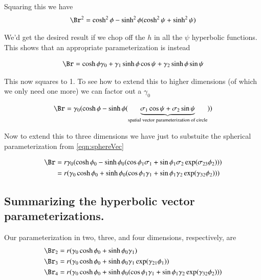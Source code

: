 \documentclass{article}
\begin{document}
Squaring this we have
\begin{align*}
\Br^2
&= \cosh^2 \phi - \sinh^2\phi (\cosh^2 \psi + \sinh^2\psi) \\
\end{align*}

We'd get the desired result if we chop off the $h$ in all the $\psi$ hyperbolic functions.  This
shows that an appropriate parameterization is instead

\begin{align*}
\Br 
&= \cosh \phi \gamma_0 + \gamma_1 \sinh\phi \cos\psi + \gamma_2 \sinh\phi \sin\psi \\
\end{align*}

This now squares to 1.  To see how to extend this to higher dimensions (of which we only need one more)
we can factor out a $\gamma_0$

\begin{align*}
\Br 
&= \gamma_0 (\cosh \phi - \sinh\phi (\underbrace{\sigma_1 \cos\psi + \sigma_2 \sin\psi}_{\text{spatial vector parameterization of circle}}) ) \\
\end{align*}

Now to extend this to three dimensions we have just to substuite the spherical parameterization from \ref{eqn:sphereVec}

\begin{align*}
\Br 
&= r \gamma_0 (\cosh \phi_0 - \sinh\phi_0 ( \cos\phi_1 \sigma_1 + \sin\phi_1 \sigma_2 \exp( \sigma_{23} \phi_2 )) ) \\
&= r (\gamma_0 \cosh \phi_0 + \sinh\phi_0 ( \cos\phi_1 \gamma_1 + \sin\phi_1 \gamma_2 \exp( \gamma_{32} \phi_2 )) ) \\
\end{align*}

\subsection{ Summarizing the hyperbolic vector parameterizations. }

Our parameterization in two, three, and four dimensions, respectively, are
\begin{align}
\Br_2 &= r (\gamma_0 \cosh \phi_0 + \sinh\phi_0 \gamma_1) \\
\Br_3 &= r (\gamma_0 \cosh \phi_0 + \sinh\phi_0 \gamma_1 \exp( \gamma_{21} \phi_1 ) ) \\
\Br_4 &= r (\gamma_0 \cosh \phi_0 + \sinh\phi_0 ( \cos\phi_1 \gamma_1 + \sin\phi_1 \gamma_2 \exp( \gamma_{32} \phi_2 )) )
\end{align}
\end{document}
